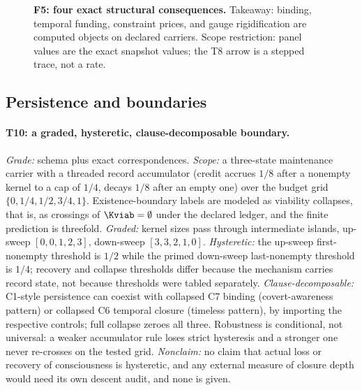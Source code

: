 \begin{figure}[t]
\centering
{}
\caption{\textbf{F5: four exact structural consequences.} Takeaway: binding,
temporal funding, constraint prices, and gauge rigidification are computed
objects on declared carriers. Scope restriction: panel values are the exact
snapshot values; the T8 arrow is a stepped trace, not a rate.}
\label{fig:atlas}
\end{figure}

\subsection{Persistence and boundaries}
\label{sec:boundaries}

\paragraph{T10: a graded, hysteretic, clause-decomposable boundary.}
\begin{theorem}
\gradeS{} \emph{Grade:} schema plus exact correspondences. \emph{Scope:} a
three-state maintenance carrier with a threaded record accumulator (credit
accrues $1/8$ after a nonempty kernel to a cap of $1/4$, decays $1/8$ after
an empty one) over the budget grid $\{0, 1/4, 1/2, 3/4, 1\}$.
Existence-boundary labels are modeled as viability collapses, that is, as
crossings of $\Kviab=\emptyset$ under the declared ledger, and the finite
prediction is threefold. \emph{Graded:} kernel sizes pass through intermediate
islands, up-sweep $[0,0,1,2,3]$, down-sweep $[3,3,2,1,0]$. \emph{Hysteretic:}
the up-sweep first-nonempty threshold is $1/2$ while the primed down-sweep
last-nonempty threshold is $1/4$; recovery and collapse thresholds differ
because the mechanism carries record state, not because thresholds were
tabled separately. \emph{Clause-decomposable:} C1-style persistence can
coexist with collapsed C7 binding (covert-awareness pattern) or collapsed C6
temporal closure (timeless pattern), by importing the respective controls;
full collapse zeroes all three. Robustness is conditional, not universal: a
weaker accumulator rule loses strict hysteresis and a stronger one never
re-crosses on the tested grid. \emph{Nonclaim:} no claim that actual loss or
recovery of consciousness is hysteretic, and any external measure of closure
depth would need its own descent audit, and none is given.
\end{theorem}

